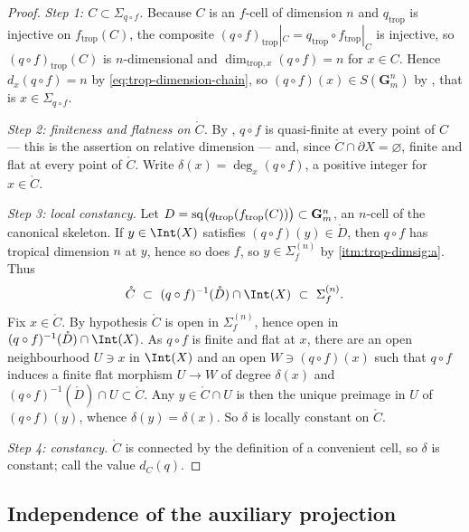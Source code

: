 \begin{proof}
\emph{Step 1: $C\subset\Sigma_{q\circ f}$.} Because $C$ is an $f$-cell of
dimension $n$ and $q_{\mathrm{trop}}$ is injective on
$f_{\mathrm{trop}}(C)$, the composite
$(q\circ f)_{\mathrm{trop}}|_C=q_{\mathrm{trop}}\circ f_{\mathrm{trop}}|_C$
is injective, so $(q\circ f)_{\mathrm{trop}}(C)$ is $n$-dimensional and
$\dim_{\mathrm{trop},x}(q\circ f)=n$ for $x\in C$. Hence
$d_x(q\circ f)=n$ by \eqref{eq:trop-dimension-chain}, so
$(q\circ f)(x)\in S(\mathbf G_m^n)$ by
, that is $x\in\Sigma_{q\circ f}$.

\emph{Step 2: finiteness and flatness on $\mathring C$.} By
, $q\circ f$ is quasi-finite at every point
of $C$ --- this is the assertion on relative dimension --- and, since
$\mathring C\cap\partial X=\varnothing$, finite and flat at every point of
$\mathring C$. Write $\delta(x)=\deg_x(q\circ f)$, a positive integer for
$x\in\mathring C$.

\emph{Step 3: local constancy.} Let $D=\operatorname{sq}\bigl(q_{\mathrm{trop}}
(f_{\mathrm{trop}}(C))\bigr)\subset\mathbf G_m^n$, an $n$-cell of the
canonical skeleton. If $y\in\Int(X)$ satisfies $(q\circ f)(y)\in\mathring D$,
then $q\circ f$ has tropical dimension $n$ at $y$, hence so does $f$, so
$y\in\Sigma_f^{(n)}$ by 
\cref{itm:trop-dimsig:a}. Thus
\[
 \mathring C\ \subset\ (q\circ f)^{-1}(\mathring D)\cap\Int(X)
 \ \subset\ \Sigma_f^{(n)} .
\]
Fix $x\in\mathring C$. By hypothesis $\mathring C$ is open in
$\Sigma_f^{(n)}$, hence open in $(q\circ f)^{-1}(\mathring D)\cap\Int(X)$.
As $q\circ f$ is finite and flat at $x$, there are an open neighbourhood
$U\ni x$ in $\Int(X)$ and an open $W\ni(q\circ f)(x)$ such that $q\circ f$
induces a finite flat morphism $U\to W$ of degree $\delta(x)$ and
$(q\circ f)^{-1}(\mathring D)\cap U\subset\mathring C$. Any
$y\in\mathring C\cap U$ is then the unique preimage in $U$ of
$(q\circ f)(y)$, whence $\delta(y)=\delta(x)$. So $\delta$ is locally
constant on $\mathring C$.

\emph{Step 4: constancy.} $\mathring C$ is connected by the definition of a
convenient cell, so $\delta$ is constant; call the value $d_C(q)$.
\end{proof}

\subsection{Independence of the auxiliary projection}

